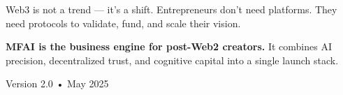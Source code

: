 \begin{mfai-warning}
Web3 is not a trend — it’s a shift. Entrepreneurs don’t need platforms. They need protocols to validate, fund, and scale their vision.
\end{mfai-warning}

\vspace{1.5em}
\begin{mfai-note}
\textbf{MFAI is the business engine for post-Web2 creators.} It combines AI precision, decentralized trust, and cognitive capital into a single launch stack.
\end{mfai-note}

\vspace{2em}

\vspace{1em}
\begin{center}
\textcolor{text-secondary}{Version 2.0 • May 2025}
\end{center}
